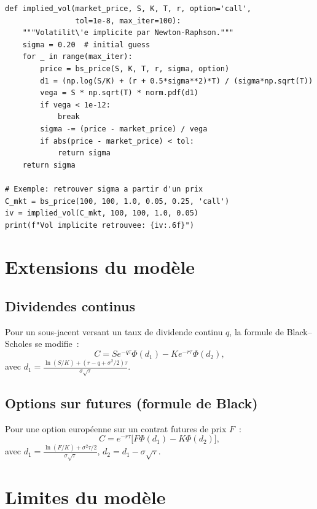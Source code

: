 \begin{codeblock}[title=\textbf{Calcul de la volatilit\'e implicite (Newton-Raphson)}]
\begin{verbatim}
def implied_vol(market_price, S, K, T, r, option='call',
                tol=1e-8, max_iter=100):
    """Volatilit\'e implicite par Newton-Raphson."""
    sigma = 0.20  # initial guess
    for _ in range(max_iter):
        price = bs_price(S, K, T, r, sigma, option)
        d1 = (np.log(S/K) + (r + 0.5*sigma**2)*T) / (sigma*np.sqrt(T))
        vega = S * np.sqrt(T) * norm.pdf(d1)
        if vega < 1e-12:
            break
        sigma -= (price - market_price) / vega
        if abs(price - market_price) < tol:
            return sigma
    return sigma

# Exemple: retrouver sigma a partir d'un prix
C_mkt = bs_price(100, 100, 1.0, 0.05, 0.25, 'call')
iv = implied_vol(C_mkt, 100, 100, 1.0, 0.05)
print(f"Vol implicite retrouvee: {iv:.6f}")
\end{verbatim}
\end{codeblock}

\section{Extensions du mod\`ele}

\subsection{Dividendes continus}

Pour un sous-jacent versant un taux de dividende continu $q$, la formule
de Black--Scholes se modifie~:
\[
    C = Se^{-q\tau}\Phi(d_1) - Ke^{-r\tau}\Phi(d_2),
\]
avec $d_1 = \frac{\ln(S/K) + (r - q + \sigma^2/2)\tau}{\sigma\sqrt{\tau}}$.

\subsection{Options sur futures (formule de Black)}

\begin{theoreme}
Pour une option europ\'eenne sur un contrat futures de prix $F$~:
\[
    C = e^{-r\tau}\bigl[F\Phi(d_1) - K\Phi(d_2)\bigr],
\]
avec $d_1 = \frac{\ln(F/K) + \sigma^2\tau/2}{\sigma\sqrt{\tau}}$,
$d_2 = d_1 - \sigma\sqrt{\tau}$.
\end{theoreme}

\section{Limites du mod\`ele}

